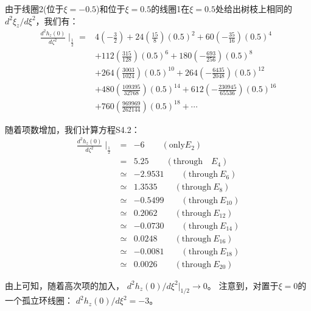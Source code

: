 由于线圈2(位于$\xi=−0.5$)和位于$\xi=0.5$的线圈1在$\xi=0.5$处给出树枝上相同的$d^2\xi_z/d\xi^2$，我们有：
\begin{equation*}
\begin{split}
\frac{d^2h_z(0)}{d\zeta^2}\mid_{\frac{1}{2}}=&4(-\frac{3}{2})+24(\frac{15}{8})(0.5)^2+60(-\frac{35}{16})(0.5)^4\\
&+112(\frac{315}{128})(0.5)^6+180(-\frac{693}{256})(0.5)^8\\
&+264(\frac{3003}{1024})(0.5)^{10}+264(-\frac{6435}{2048})(0.5)^{12}\\
&+480(\frac{109395}{32768})(0.5)^{14}+612(-\frac{230945}{65536})(0.5)^{16}\\
&+760(\frac{969969}{262144})(0.5)^{18}+\cdots
\end{split}\tag{S4.2}
\end{equation*}

随着项数增加，我们计算方程S4.2：
\begin{eqnarray*}
\frac{d^2h_z(0)}{d\zeta^2}\mid_{\frac{1}{2}}&=&-6\qquad (\mbox{only} E_2)\\
&=&5.25  \qquad (\mbox{through}\quad E_4)\\
&\simeq& -2.9531\qquad   (\mbox{through}\ E_6)\\
&\simeq& 1.3535\qquad (\mbox{through}\ E_8)\\
&\simeq& -0.5499\qquad   (\mbox{through}\ E_{10})\\
&\simeq& 0.2062 \qquad (\mbox{through}\ E_{12})\\
&\simeq& -0.0730\qquad   (\mbox{through}\ E_{14})\\
&\simeq& 0.0248 \qquad  (\mbox{through}\ E_{16})\\
&\simeq&-0.0081\qquad  (\mbox{through}\ E_{18})\\
&\simeq& 0.0026 \qquad (\mbox{through}\ E_{20})
\end{eqnarray*}


由上可知，随着高次项的加入， $d^2h_z(0)/d\xi^2|_{1/2}\rightarrow 0$。
注意到，对置于$\xi=0$的一个孤立环线圈： $d^2h_z(0)/d\xi^2=−3$。



